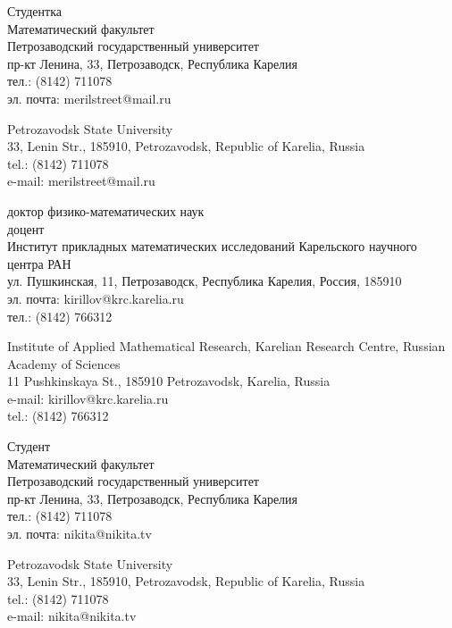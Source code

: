 \documentclass{article}
\begin{document}
\begin{aboutauthors}
Студентка\\
Математический факультет\\ 
Петрозаводский государственный университет\\
пр-кт Ленина, 33, Петрозаводск, Республика Карелия\\
тел.: (8142) 711078\\
эл. почта: merilstreet@mail.ru

\columnbreak

Petrozavodsk State University\\
33, Lenin Str., 185910, Petrozavodsk, Republic of Karelia, Russia\\
tel.: (8142) 711078\\
e-mail: merilstreet@mail.ru
\end{aboutauthors}

\begin{aboutauthors}
доктор физико-математических наук\\ 
доцент\\
Институт прикладных математических исследований Карельского научного центра РАН\\ 
ул. Пушкинская, 11, Петрозаводск, Республика Карелия, Россия, 185910\\
эл. почта: kirillov@krc.karelia.ru\\
тел.: (8142) 766312

\columnbreak

Institute of Applied Mathematical Research, Karelian Research Centre, Russian Academy of Sciences\\
11 Pushkinskaya St., 185910 Petrozavodsk, Karelia, Russia\\
e-mail: kirillov@krc.karelia.ru\\
tel.: (8142) 766312
\end{aboutauthors}

\begin{aboutauthors}
Студент\\
Математический факультет\\ 
Петрозаводский государственный университет\\
пр-кт Ленина, 33, Петрозаводск, Республика Карелия\\
тел.: (8142) 711078\\
эл. почта: nikita@nikita.tv

\columnbreak

Petrozavodsk State University\\
33, Lenin Str., 185910, Petrozavodsk, Republic of Karelia, Russia\\
tel.: (8142) 711078\\
e-mail: nikita@nikita.tv 
\end{aboutauthors}
\end{document}
